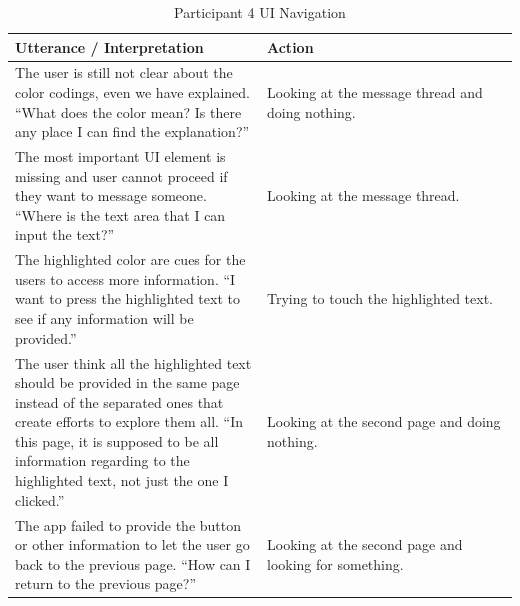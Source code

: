 \documentclass[acmsmall,screen,authorversion,nonacm]{acmart}
\begin{document}
\begin{table}[H]
\begin{tabular}{|p{0.5 \linewidth}|p{0.5 \linewidth}|}
\hline
Utterance / Interpretation & Action                                               \\ \hline
The user is still not clear about the color codings, even we have explained. ``What does the color mean? Is there any place I can find the explanation?'' & Looking at the message thread and doing nothing.                                  \\ \hline
The most important UI element is missing and user cannot proceed if they want to message someone. ``Where is the text area that I can input the text?'' & Looking at the message thread.              
\\ \hline
The highlighted color are cues for the users to access more information. ``I want to press the highlighted text to see if any information will be provided.'' & Trying to touch the highlighted text.
\\ \hline
The user think all the highlighted text should be provided in the same page instead of the separated ones that create efforts to explore them all. ``In this page, it is supposed to be all information regarding to the highlighted text, not just the one I clicked.'' & Looking at the second page and doing nothing. 
\\ \hline
The app failed to provide the button or other information to let the user go back to the previous page. ``How can I return to the previous page?'' & Looking at the second page and looking for something.    \\ \hline
\end{tabular}
\caption{Participant 4 UI Navigation}
\label{tab:SimpUser4Task1}
\end{table}
\end{document}
